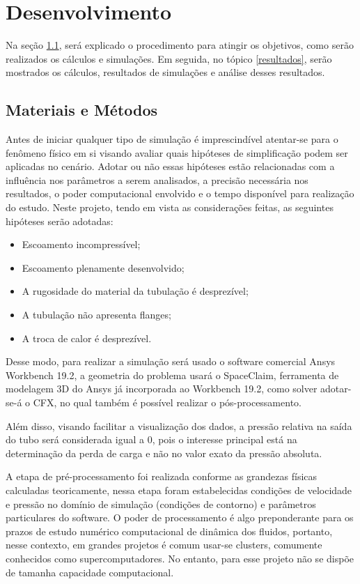 \documentclass[12pt]{article}
\begin{document}
\section{Desenvolvimento}

Na seção \ref{mm}, será explicado o procedimento para atingir os objetivos, como serão realizados os cálculos e simulações. Em seguida, no tópico \ref{resultados}, serão mostrados os cálculos, resultados de simulações e análise desses resultados.
\subsection{Materiais e Métodos}
\label{mm}
Antes de iniciar qualquer tipo de simulação é imprescindível atentar-se para o fenômeno físico em si visando avaliar quais hipóteses de simplificação podem ser aplicadas no cenário. Adotar ou não essas hipóteses estão relacionadas com a influência nos parâmetros a serem analisados, a precisão necessária nos resultados, o poder computacional envolvido e o tempo disponível para realização do estudo.
Neste projeto, tendo em vista as considerações feitas, as seguintes hipóteses serão adotadas: 
\begin{itemize}
	\item Escoamento incompressível;
	\item Escoamento plenamente desenvolvido;
	\item A rugosidade do material da tubulação é desprezível;
	\item A tubulação não apresenta flanges;
	\item A troca de calor é desprezível.
\end{itemize}

Desse modo, para realizar a simulação será usado o software comercial Ansys Workbench 19.2, a geometria do problema usará o SpaceClaim, ferramenta de modelagem 3D do Ansys já incorporada ao Workbench 19.2, como solver adotar-se-á o CFX, no qual também é possível realizar o pós-processamento.

Além disso, visando facilitar a visualização dos dados, a pressão relativa na saída do tubo será considerada igual a 0, pois o interesse principal está na determinação da perda de carga e não no valor exato da pressão absoluta. 

A etapa de pré-processamento foi realizada conforme as grandezas físicas calculadas teoricamente, nessa etapa foram estabelecidas condições de velocidade e pressão no domínio de simulação (condições de contorno) e parâmetros particulares do software. O poder de processamento é algo preponderante para os prazos de estudo numérico computacional de dinâmica dos fluidos, portanto, nesse contexto, em grandes projetos é comum usar-se clusters, comumente conhecidos como supercomputadores. No entanto, para esse projeto não se dispõe de tamanha capacidade computacional. 
\end{document}
